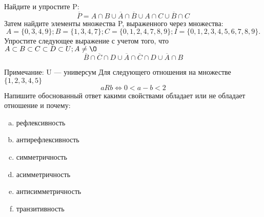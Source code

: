 \documentclass[10pt]{exam}
\begin{document}
\begin{questions}
\question
Найдите и упростите P:
\begin{equation*}
\overline{P} = A \cap B \cup \overline{A} \cap \overline{B} \cup A \cap C \cup \overline{B} \cap C
\end{equation*}
Затем найдите элементы множества P, выраженного через множества:
\begin{equation*}
A = \{0, 3, 4, 9\}; 
B = \{1, 3, 4, 7\};
C = \{0, 1, 2, 4, 7, 8, 9\};
I = \{0, 1, 2, 3, 4, 5, 6, 7, 8, 9\}.
\end{equation*}\question
Упростите следующее выражение с учетом того, что $A\subset B \subset C \subset D \subset U; A \neq \O$
\begin{equation*}
\overline{B} \cap \overline{C} \cap D \cup \overline{A} \cap \overline{C} \cap D \cup \overline{A} \cap B
\end{equation*}

Примечание: U — универсум\question
Для следующего отношения на множестве $\{1, 2, 3, 4, 5\}$ 
\begin{equation*}
aRb \iff 0 < a-b<2
\end{equation*}
Напишите обоснованный ответ какими свойствами обладает или не обладает отношение и почему:   
\begin{enumerate} [a)]\setcounter{enumi}{0}
\item рефлексивность
\item антирефлексивность
\item симметричность
\item асимметричность
\item антисимметричность
\item транзитивность
\end{enumerate}


\end{questions}
\end{document}

